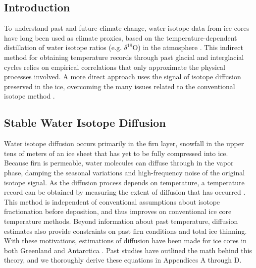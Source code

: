 \documentclass[draft, jgrga]{AGUTeX}
\begin{document}


\begin{article}

\section{Introduction}

To understand past and future climate change, water isotope data from ice cores have long been used as climate proxies, based on the temperature-dependent distillation of water isotope ratios (e.g. $\delta^{18}$O) in the atmosphere \citep{Epstein1951,Dansgaard1954,Dansgaard1964}. This indirect method for obtaining temperature records through past glacial and interglacial cycles relies on empirical correlations that only approximate the physical processes involved. A more direct approach uses the signal of isotope diffusion preserved in the ice, overcoming the many issues related to the conventional
isotope method \citep{Johnsen2000}.

\subsection{Stable Water Isotope Diffusion}

Water isotope diffusion occurs primarily in the firn layer, snowfall in the upper tens of meters of an ice sheet that has yet to be fully compressed into ice. Because firn is permeable, water molecules can diffuse through in the vapor phase, damping the seasonal variations and high-frequency noise of the original isotope signal. As the diffusion process depends on temperature, a temperature record can be obtained by measuring the extent of diffusion that has occurred \citep{Johnsen2000}. This method is independent of conventional assumptions about isotope fractionation before deposition, and thus improves on conventional ice core temperature methods. Beyond information about past temperature, diffusion estimates also provide constraints on past firn conditions and total ice thinning. With these motivations, estimations of diffusion have been made for ice cores in both Greenland and Antarctica \citep{Simonsen2011,Gkinis2014,vanderWel2015,Jones2017a,Holme2017}. Past studies have outlined the math behind this theory, and we thoroughly derive these equations in Appendices A through D.


\end{article}
\end{document}
